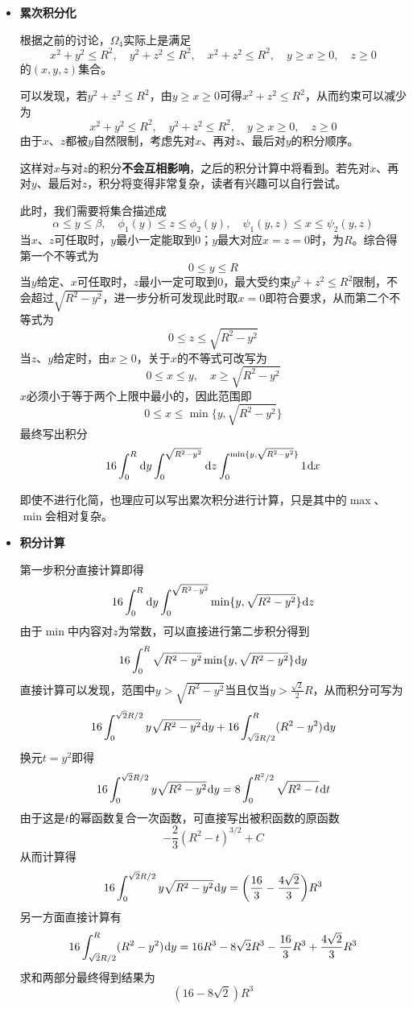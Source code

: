 \documentclass[a4paper,UTF8,fontset=windows,AutoFakeBold]{ctexart}
\newcommand*{\dr}{\hspace{0.07em}\mathrm{d}}
\newcommand*{\note}{\noindent *}
\theoremstyle{ex}
\begin{document}
\begin{framed}
{\begin{itemize}
        \note 注意反射对称必须\textbf{一步步}进行，因为反射后区域的对称性未必与原区域相同。例如，$\Omega$满足$(x,y,z)\in\Omega$当且仅当$(y,x,z)\in\Omega$，但$\Omega_1$、$\Omega_4$不满足，$\Omega_2$、$\Omega_3$满足。

        \item \textbf{累次积分化}
        
        根据之前的讨论，$\Omega_4$实际上是满足
        $$x^2+y^2\le R^2,\quad y^2+z^2\le R^2,\quad x^2+z^2\le R^2,\quad y\ge x\ge0,\quad z\ge0$$
        的$(x,y,z)$集合。

        可以发现，若$y^2+z^2\le R^2$，由$y\ge x\ge0$可得$x^2+z^2\le R^2$，从而约束可以减少为
        $$x^2+y^2\le R^2,\quad y^2+z^2\le R^2,\quad y\ge x\ge0,\quad z\ge0$$
        由于$x$、$z$都被$y$自然限制，考虑先对$x$、再对$z$、最后对$y$的积分顺序。
        
        \note 这样对$x$与对$z$的积分\textbf{不会互相影响}，之后的积分计算中将看到。若先对$x$、再对$y$、最后对$z$，积分将变得非常复杂，读者有兴趣可以自行尝试。
        
        此时，我们需要将集合描述成
        $$\alpha\le y\le\beta,\quad\phi_1(y)\le z\le\phi_2(y),\quad\psi_1(y,z)\le x\le\psi_2(y,z)$$
        当$x$、$z$可任取时，$y$最小一定能取到0；$y$最大对应$x=z=0$时，为$R$。综合得第一个不等式为
        $$0\le y\le R$$
        当$y$给定、$x$可任取时，$z$最小一定可取到0，最大受约束$y^2+z^2\le R^2$限制，不会超过$\sqrt{R^2-y^2}$，进一步分析可发现此时取$x=0$即符合要求，从而第二个不等式为
        $$0\le z\le\sqrt{R^2-y^2}$$
        当$z$、$y$给定时，由$x\ge0$，关于$x$的不等式可改写为
        $$0\le x\le y,\quad x\ge\sqrt{R^2-y^2}$$
        $x$必须小于等于两个上限中最小的，因此范围即
        $$0\le x\le\min\{y,\sqrt{R^2-y^2}\}$$
        最终写出积分
        $$16\int_0^R\dr y\int_0^{\sqrt{R^2-y^2}}\dr z\int_0^{\min\{y,\sqrt{R^2-y^2}\}}1\dr x$$

        \note 即使不进行化简，也理应可以写出累次积分进行计算，只是其中的$\max$、$\min$会相对复杂。

        \item \textbf{积分计算}
        
        第一步积分直接计算即得
        $$16\int_0^R\dr y\int_0^{\sqrt{R^2-y^2}}\min\{y,\sqrt{R^2-y^2}\}\dr z$$
        由于$\min$中内容对$z$为常数，可以直接进行第二步积分得到
        $$16\int_0^R\sqrt{R^2-y^2}\min\{y,\sqrt{R^2-y^2}\}\dr y$$
        直接计算可以发现，范围中$y>\sqrt{R^2-y^2}$当且仅当$y>\frac{\sqrt2}{2}R$，从而积分可写为
        $$16\int_0^{\sqrt2R/2}y\sqrt{R^2-y^2}\dr y+16\int_{\sqrt2R/2}^R(R^2-y^2)\dr y$$
        换元$t=y^2$即得
        $$16\int_0^{\sqrt2R/2}y\sqrt{R^2-y^2}\dr y=8\int_0^{R^2/2}\sqrt{R^2-t}\dr t$$
        由于这是$t$的幂函数复合一次函数，可直接写出被积函数的原函数
        $$-\frac{2}{3}(R^2-t)^{3/2}+C$$
        从而计算得
        $$16\int_0^{\sqrt2R/2}y\sqrt{R^2-y^2}\dr y=\bigg(\frac{16}{3}-\frac{4\sqrt{2}}{3}\bigg)R^3$$
        另一方面直接计算有
        $$16\int_{\sqrt2R/2}^R(R^2-y^2)\dr y=16R^3-8\sqrt2R^3-\frac{16}{3}R^3+\frac{4\sqrt{2}}{3}R^3$$
        求和两部分最终得到结果为
        $$(16-8\sqrt{2})R^3$$
    \end{itemize}
}
\end{framed}
\end{document}
